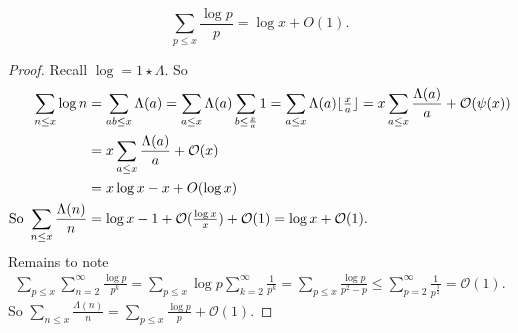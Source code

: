 \documentclass{article}
\newcommand{\bigO}{\mathcal{O}}
\DeclarePairedDelimiter\floor{\lfloor}{\rfloor}
\begin{document}
\begin{nlemma}\label{lem:7}
  \begin{equation*}
    \sum_{p \leq x} \frac{\log p}{p} = \log x + O(1).
  \end{equation*}
\end{nlemma}
\begin{proof}
  Recall $\log = 1 \star \Lambda$. So
  \begin{align*}
    \sum_{n \leq x} \log n &= \sum_{ab \leq x} \Lambda(a) = \sum_{a \leq x} \Lambda(a) \sum_{b \leq \frac{x}{a}} 1 = \sum_{a \leq x} \Lambda(a) \floor{\tfrac{x}{a}} = x \sum_{a \leq x} \frac{\Lambda(a)}{a} + \bigO(\psi(x)) \\
&= x \sum_{a \leq x} \frac{\Lambda(a)}{a} + \bigO(x) \\
&= x \log x - x + O(\log x) \\
    \text{So }\sum_{n \leq x} \frac{\Lambda(n)}{n} &= \log x - 1 + \mathcal{O}(\tfrac{\log x}{x}) + \bigO(1) = \log x + \bigO(1).
  \end{align*}
  Remains to note
  \begin{align*}
    \sum_{p \leq x} \sum_{n=2}^\infty \frac{\log p}{p^k} = \sum_{p \leq x} \log p \sum_{k=2}^\infty \frac{1}{p^k} = \sum_{p \leq x} \frac{\log p}{p^2 - p} \leq \sum_{p=2}^\infty \frac{1}{p^{\frac{3}{2}}} = \bigO(1).
  \end{align*}
  So  $\sum_{n \leq x} \frac{\Lambda(n)}n = \sum_{p \leq x} \frac{\log p}{p} + \bigO(1)$.
\end{proof}
\clearpage
\printnomenclature
\printindex
\end{document}
